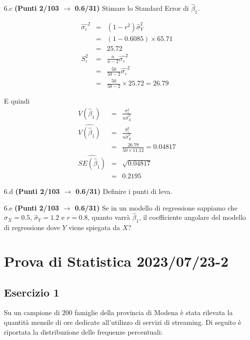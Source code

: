 \documentclass[
  11pt,
]{book}
\theoremstyle{mytheoremstyle}
\theoremstyle{mydefstyle}
\newenvironment{sol}
  {
  \begin{tcolorbox}[enhanced,breakable,arc=0.1mm,boxrule=1pt,colback=white,colframe=iblue,
  title=\bf \fontfamily{lmss}\selectfont \hspace{.5 cm} Soluzione,drop fuzzy shadow]

}{
\end{tcolorbox}
  }
\begin{document}
6.c \textbf{(Punti 2/103 \(\rightarrow\) 0.6/31)} Stimare lo Standard Error di \(\hat\beta_1\).

\begin{sol}
\begin{eqnarray*}
\hat{\sigma_\varepsilon}^2&=&(1-r^2)\hat\sigma_Y^2\\
&=& (1- 0.6085 )\times 65.71 \\
   &=&  25.72 \\
   S_\varepsilon^2 &=& \frac{n} {n-2} \hat{\sigma_\varepsilon}^2\\
   &=&  \frac{ 50 } { 50 -2} \hat{\sigma_\varepsilon}^2 \\
 &=&  \frac{ 50 } { 50 -2} \times  25.72  =  26.79  
\end{eqnarray*}

E quindi\begin{eqnarray*}
V(\hat\beta_{1}) &=& \frac{\sigma_{\varepsilon}^{2}} {n \hat{\sigma}^{2}_{X}} \\
\widehat{V(\hat\beta_{1})} &=& \frac{S_{\varepsilon}^{2}} {n \hat{\sigma}^{2}_{X}} \\
 &=& \frac{ 26.79 } { 50 \times  11.12 } =  0.04817 \\
 \widehat{SE(\hat\beta_{1})}        &=&  \sqrt{ 0.04817 }\\
 &=&  0.2195 
\end{eqnarray*}

\end{sol}

6.d \textbf{(Punti 2/103 \(\rightarrow\) 0.6/31)} Definire i punti di leva.

6.e \textbf{(Punti 2/103 \(\rightarrow\) 0.6/31)} Se in un modello di regressione sappiamo che \(\hat\sigma_X=0.5\), \(\hat\sigma_Y=1.2\) e \(r=0.8\), quanto varrà \(\hat\beta_1\), il coefficiente angolare del modello di regressione dove \(Y\) viene spiegata da \(X\)?

\section{Prova di Statistica 2023/07/23-2}\label{prova-di-statistica-20230723-2}

\subsection{Esercizio 1}\label{esercizio-1-32}

Su un campione di \(200\) famiglie della provincia di Modena è stata rilevata la quantità mensile di ore dedicate all'utilizzo di servizi di streaming. Di seguito è riportata la distribuzione delle frequenze percentuali:
\end{document}
